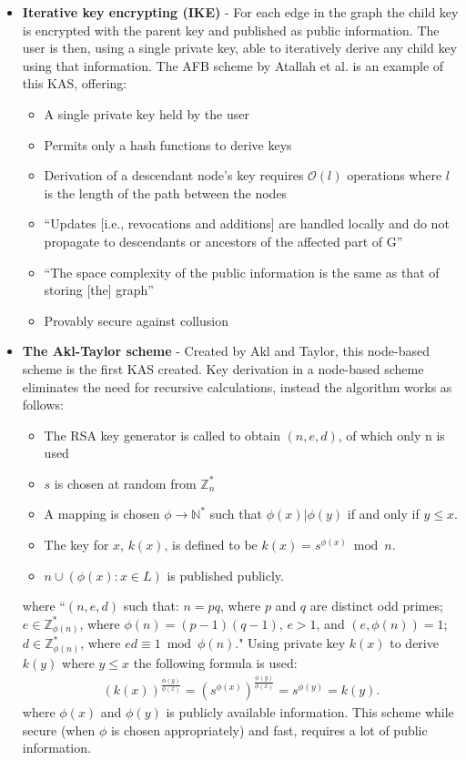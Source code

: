 \documentclass[12pt, titlepage]{article}
\begin{document}
\begin{itemize}
\item \textbf{Iterative key encrypting (IKE)} - For each edge in the graph the child key is encrypted with the parent key and published as public information. The user is then, using a single private key, able to iteratively derive any child key using that information.\cite{lazyEncryption} The AFB scheme by Atallah et al. is an example of this KAS, offering:\cite{atallah2005}
\begin{itemize}
\item A single private key held by the user
\item Permits only a hash functions to derive keys
\item Derivation of a descendant node's key requires $\mathcal{O}(l)$ operations where $l$ is the length of the path between the nodes
\item ``Updates [i.e., revocations and additions] are handled locally and do not propagate to descendants or ancestors of the affected part of G''
\item ``The space complexity of the public information is the same as that of
storing [the] graph''
\item Provably secure against collusion
\end{itemize}


\item \textbf{The Akl-Taylor scheme} - Created by Akl and Taylor, this node-based scheme is the first KAS created. Key derivation in a node-based scheme eliminates the need for recursive calculations, instead the algorithm works as follows:\cite{lazyEncryption}
\begin{itemize}
\item The RSA key generator is called to obtain $(n, e, d)$, of which only n is used
\item $s$ is chosen at random from $\mathbb{Z}^{*}_{n}$
\item A mapping is chosen $\phi \rightarrow \mathbb{N}^{*}$ such that $\phi(x) | \phi(y)$ if and only if $y≤x$.
\item The key for $x$, $k(x)$, is defined to be $k(x) = s^{ \phi (x)} \bmod n$.
\item ${n} \cup (\phi(x) : x ∈ L)$ is published publicly.
\end{itemize}
where ``$(n, e, d)$ such that: $n = pq$, where $p$ and $q$ are distinct odd primes; $e ∈ \mathbb{Z}^{*}_{\phi(n)}$, where $\phi(n) = (p − 1)(q − 1)$, $e > 1$, and $(e, \phi(n)) = 1$; $d ∈ \mathbb{Z}^{*}_{\phi(n)}$, where $ed \equiv 1 \bmod \phi(n)$."
\newline Using private key $k(x)$ to derive $k(y)$ where $y≤x$ the following formula is used:
\begin{align*}
(k(x))^{\frac{\phi(y)}{\phi(x)}} = (s^{\phi(x)})^{\frac{\phi(y)}{\phi(x)}} = s^{\phi(y)} = k(y).
\end{align*}
where $\phi(x)$ and $\phi(y)$ is publicly available information.
\newline \indent This scheme while secure (when $\phi$ is chosen appropriately) and fast, requires a lot of public information.
\end{itemize}
\end{document}
